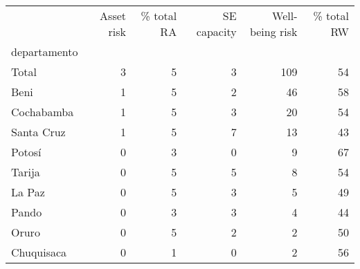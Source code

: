 \begin{tabular}{lrrrrr}
\toprule
{} &  Asset risk &  \% total RA &  SE capacity &  Well-being risk &  \% total RW \\
departamento &             &             &              &                  &             \\
\midrule
Total        &           3 &           5 &            3 &              109 &          54 \\
Beni         &           1 &           5 &            2 &               46 &          58 \\
Cochabamba   &           1 &           5 &            3 &               20 &          54 \\
Santa Cruz   &           1 &           5 &            7 &               13 &          43 \\
Potosí       &           0 &           3 &            0 &                9 &          67 \\
Tarija       &           0 &           5 &            5 &                8 &          54 \\
La Paz       &           0 &           5 &            3 &                5 &          49 \\
Pando        &           0 &           3 &            3 &                4 &          44 \\
Oruro        &           0 &           5 &            2 &                2 &          50 \\
Chuquisaca   &           0 &           1 &            0 &                2 &          56 \\
\bottomrule
\end{tabular}
